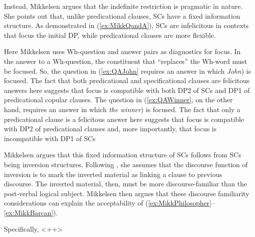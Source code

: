 \documentclass[
	letterpaper,
]{article}
\newcommand\quelle[1]{{%
  \unskip\nobreak\hfil\penalty50
  \hskip2em\hbox{}\nobreak\hfil#1%
  \parfillskip=0pt \finalhyphendemerits=0 \par}}
\begin{document}
Instead, Mikkelsen argues that the indefinite restriction is pragmatic in nature.
She points out \parencite[following, among others,][]{halliday1967notes} that, unlike predicational clauses, SCs have a fixed information structure.
As demonstrated in (\ref{ex:MikkQandA}), SCs are infelicitous in contexts that focus the initial DP, while predicational clauses are more flexible.
\begin{exe}
\ex\label{ex:MikkQandA}
\end{exe}
Here Mikkelsen uses Wh-question and answer pairs as diagnostics for focus.
In the answer to a Wh-question, the constituent that ``replaces'' the Wh-word must be focused.
So, the question in (\ref{ex:QAJohn} requires an answer in which \textit{John}) is focused.
The fact that both predicational and specificational clauses are felicitous answers here suggests that focus is compatible with both DP2 of SCs and DP1 of predicational copular clauses.
The question in (\ref{ex:QAWinner}, on the other hand, requires an answer in which \textit{the winner}) is focused.
The fact that only a predicational clause is a felicitous answer here suggests that focus is compatible with DP2 of predicational clauses and, more importantly, that focus is incompatible with DP1 of SCs

Mikkelsen argues that this fixed information structure of SCs follows from SCs being inversion structures.
Following \textcite{birner1994information,birner1996discourse}, she assumes that the discourse function of inversion is to mark the inverted material as linking a clause to previous discourse.
The inverted material, then, must be more discourse-familiar than the post-verbal logical subject.
Mikkelsen then argues that these discourse familiarity considerations can explain the acceptability of (\ref{ex:MikkPhilosopher}--\ref{ex:MikkBarcan}).

Specifically, <++>
\end{document}

